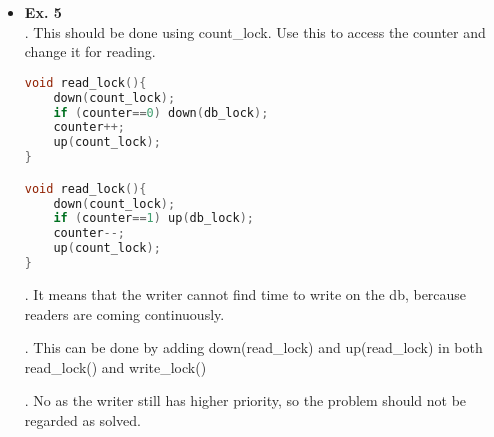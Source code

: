\documentclass{article}
\begin{document}
\begin{itemize}
\item {\bf Ex. 5}\\

{. This should be done using count\_lock. Use this to access the counter and change it for reading.}

\begin{lstlisting}[language=C]
void read_lock(){
    down(count_lock);
    if (counter==0) down(db_lock);
    counter++;
    up(count_lock);      
}

void read_lock(){
    down(count_lock);
    if (counter==1) up(db_lock);
    counter--;
    up(count_lock);      
}


\end{lstlisting}
{. It means that the writer cannot find time to write on the db, bercause readers are coming continuously.\\}

{. This can be done by adding down(read\_lock) and up(read\_lock) in both read\_lock() and write\_lock()\\}

{. No as the writer still has higher priority, so the problem should not be regarded as solved.}

\end{itemize}
\end{document}
